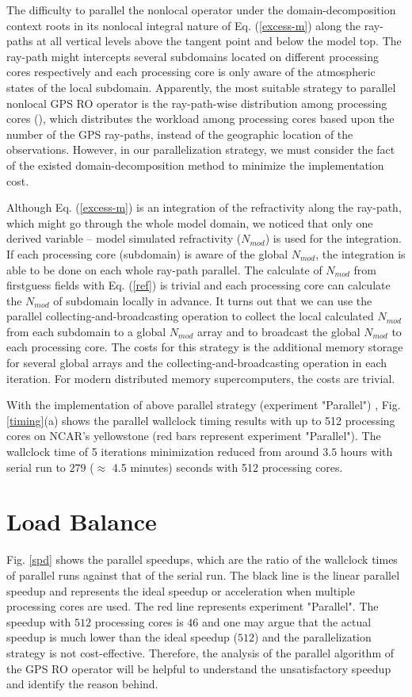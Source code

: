 \documentclass[12pt]{article}
\begin{document}
The difficulty to parallel the nonlocal operator under the domain-decomposition context roots in its nonlocal integral nature of Eq. (\ref{excess-m}) along the ray-paths at all vertical levels above the tangent point and below the model top. The ray-path might intercepts several subdomains located on different processing cores respectively and each processing core is only aware of the atmospheric states of the local subdomain. Apparently, the most suitable strategy to parallel nonlocal GPS RO operator is the ray-path-wise distribution among processing cores (\cite{ZhangX2004}), which distributes the workload among processing cores based upon the number of the GPS ray-paths, instead of the geographic location of the observations. However, in our parallelization strategy, we must consider the fact of the existed domain-decomposition method to minimize the implementation cost. 

Although Eq. (\ref{excess-m}) is an integration of the refractivity along the ray-path, which might go through the whole model domain, we noticed that only one derived variable -- model simulated refractivity ($N_{mod}$) is used for the integration. If each processing core (subdomain) is aware of the global $N_{mod}$, the integration is able to be done on each whole ray-path parallel. The calculate of $N_{mod}$ from firstguess fields with Eq. (\ref{ref}) is trivial and each processing core can calculate the $N_{mod}$ of subdomain locally in advance. It turns out that we can use the parallel collecting-and-broadcasting operation to collect the local calculated $N_{mod}$ from each subdomain to a global $N_{mod}$ array and to broadcast the global $N_{mod}$ to each processing core. The costs for this strategy is the additional memory storage for several global arrays and the collecting-and-broadcasting operation in each iteration. For modern distributed memory supercomputers, the costs are trivial.

With the implementation of above parallel strategy (experiment "Parallel") , Fig. \ref{timing}(a) shows the parallel wallclock timing results with up to 512 processing cores on NCAR's yellowstone (red bars represent experiment "Parallel"). The wallclock time of 5 iterations minimization reduced from around $3.5$ hours with serial run to $279$ ($\approx$ 4.5 minutes) seconds with 512 processing cores. 

\section{Load Balance}
\label{sec:load}
Fig. \ref{spd} shows the parallel speedups, which are the ratio of the wallclock times of parallel runs against that of the serial run. The black line is the linear parallel speedup and represents the ideal speedup or acceleration when multiple processing cores are used. The red line represents experiment "Parallel". The speedup with $512$ processing cores is $46$ and one may argue that  the actual speedup is much lower than the ideal speedup ($512$) and the parallelization strategy is not cost-effective. Therefore, the analysis of the parallel algorithm of the GPS RO operator will be helpful to understand the unsatisfactory speedup and identify the reason behind.
\end{document}
